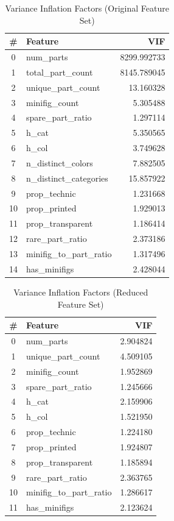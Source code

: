 \documentclass[11pt, letterpaper]{article}
\begin{document}
\begin{table}[h]
\centering
\caption{Variance Inflation Factors (Original Feature Set)}
\label{tab:vif_original}
\begin{tabular}{clr}
\hline
\textbf{\#} & \textbf{Feature} & \textbf{VIF} \\
\hline
0  & num\_parts              & 8299.992733 \\
1  & total\_part\_count       & 8145.789045 \\
2  & unique\_part\_count      & 13.160328 \\
3  & minifig\_count          & 5.305488 \\
4  & spare\_part\_ratio       & 1.297114 \\
5  & h\_cat                  & 5.350565 \\
6  & h\_col                  & 3.749628 \\
7  & n\_distinct\_colors      & 7.882505 \\
8  & n\_distinct\_categories  & 15.857922 \\
9  & prop\_technic           & 1.231668 \\
10 & prop\_printed           & 1.929013 \\
11 & prop\_transparent       & 1.186414 \\
12 & rare\_part\_ratio        & 2.373186 \\
13 & minifig\_to\_part\_ratio  & 1.317496 \\
14 & has\_minifigs           & 2.428044 \\
\hline
\end{tabular}
\end{table}

\begin{table}[h]
\centering
\caption{Variance Inflation Factors (Reduced Feature Set)}
\label{tab:vif_reduced}
\begin{tabular}{clr}
\hline
\textbf{\#} & \textbf{Feature} & \textbf{VIF} \\
\hline
0  & num\_parts              & 2.904824 \\
1  & unique\_part\_count      & 4.509105 \\
2  & minifig\_count          & 1.952869 \\
3  & spare\_part\_ratio       & 1.245666 \\
4  & h\_cat                  & 2.159906 \\
5  & h\_col                  & 1.521950 \\
6  & prop\_technic           & 1.224180 \\
7  & prop\_printed           & 1.924807 \\
8  & prop\_transparent       & 1.185894 \\
9  & rare\_part\_ratio        & 2.363765 \\
10 & minifig\_to\_part\_ratio  & 1.286617 \\
11 & has\_minifigs           & 2.123624 \\
\hline
\end{tabular}
\end{table}
\end{document}

